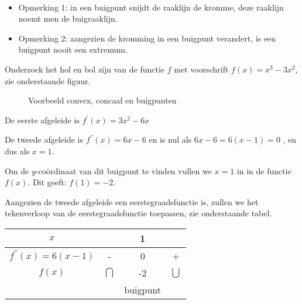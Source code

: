 \begin{opmerking}
	\ \\
	\begin{itemize}
	\item Opmerking 1: in een buigpunt snijdt de raaklijn de kromme,
	deze raaklijn noemt men de buigraaklijn.
	
	\item Opmerking 2: aangezien de kromming in een buigpunt verandert,
	is een buigpunt nooit een extremum.
\end{itemize}

\end{opmerking}


\begin{voorbeeld}
	Onderzoek het hol en bol zijn van
de functie $f$ met voorschrift $f(x)=x^{3}-3x^{2}$, zie onderstaande figuur.


\begin{figure}[H]
	\centering          
	
	\caption{Voorbeeld convex, concaaf en buigpunten}
	\label{fig:verloop_convex_concaaf_buigpunten}	
\end{figure}


De eerste afgeleide is $f^{'}(x)=3x^{2}-6x$ 

De tweede afgeleide is $f^{''}(x)=6x-6$ en is nul als $6x-6=6(x-1)=0$
, en dus als $x=1$.

Om de $y$-co\"ordinaat van dit buigpunt te vinden vullen
we $x=1$ in in de functie $f(x)$. Dit geeft: $f(1)=-2$.

Aangezien de tweede afgeleide een eerstegraadsfunctie is,
zullen we het tekenverloop van de eerstegraadsfunctie toepassen, zie onderstaande tabel.

\begin{center}
	\begin{tabular}{c||c|c|c}
	$x$ &  & 1 & \tabularnewline
	\hline 
	$f^{''}(x)=6(x-1)$ & - & 0 & +\\
	\hline 
	$f(x)$ & $\bigcap$ & -2 & $\bigcup$\\
	&  & buigpunt & \\
\end{tabular}
\end{center}

\end{voorbeeld}
